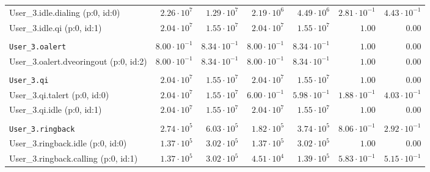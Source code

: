\begin{table}[htbp]
{\begin{tabular}{lrrrrrr}
\hspace{3mm}User\_3.idle.dialing (p:0, id:0)          &  $2.26 \cdot 10^{7}$ &  $1.29 \cdot 10^{7}$ &  $2.19 \cdot 10^{6}$ &  $4.49 \cdot 10^{6}$ & $2.81 \cdot 10^{-1}$ & $4.43 \cdot 10^{-1}$ \\
\hspace{3mm}User\_3.idle.qi (p:0, id:1)               &  $2.04 \cdot 10^{7}$ &  $1.55 \cdot 10^{7}$ &  $2.04 \cdot 10^{7}$ &  $1.55 \cdot 10^{7}$ &               $1.00$ &               $0.00$ \\
\\[-8pt]\texttt{User\_3.oalert}                       & $8.00 \cdot 10^{-1}$ & $8.34 \cdot 10^{-1}$ & $8.00 \cdot 10^{-1}$ & $8.34 \cdot 10^{-1}$ &               $1.00$ &               $0.00$ \\
\hspace{3mm}User\_3.oalert.dveoringout (p:0, id:2)    & $8.00 \cdot 10^{-1}$ & $8.34 \cdot 10^{-1}$ & $8.00 \cdot 10^{-1}$ & $8.34 \cdot 10^{-1}$ &               $1.00$ &               $0.00$ \\
\\[-8pt]\texttt{User\_3.qi}                           &  $2.04 \cdot 10^{7}$ &  $1.55 \cdot 10^{7}$ &  $2.04 \cdot 10^{7}$ &  $1.55 \cdot 10^{7}$ &               $1.00$ &               $0.00$ \\
\hspace{3mm}User\_3.qi.talert (p:0, id:0)             &  $2.04 \cdot 10^{7}$ &  $1.55 \cdot 10^{7}$ & $6.00 \cdot 10^{-1}$ & $5.98 \cdot 10^{-1}$ & $1.88 \cdot 10^{-1}$ & $4.03 \cdot 10^{-1}$ \\
\hspace{3mm}User\_3.qi.idle (p:0, id:1)               &  $2.04 \cdot 10^{7}$ &  $1.55 \cdot 10^{7}$ &  $2.04 \cdot 10^{7}$ &  $1.55 \cdot 10^{7}$ &               $1.00$ &               $0.00$ \\
\\[-8pt]\texttt{User\_3.ringback}                     &  $2.74 \cdot 10^{5}$ &  $6.03 \cdot 10^{5}$ &  $1.82 \cdot 10^{5}$ &  $3.74 \cdot 10^{5}$ & $8.06 \cdot 10^{-1}$ & $2.92 \cdot 10^{-1}$ \\
\hspace{3mm}User\_3.ringback.idle (p:0, id:0)         &  $1.37 \cdot 10^{5}$ &  $3.02 \cdot 10^{5}$ &  $1.37 \cdot 10^{5}$ &  $3.02 \cdot 10^{5}$ &               $1.00$ &               $0.00$ \\
\hspace{3mm}User\_3.ringback.calling (p:0, id:1)      &  $1.37 \cdot 10^{5}$ &  $3.02 \cdot 10^{5}$ &  $4.51 \cdot 10^{4}$ &  $1.39 \cdot 10^{5}$ & $5.83 \cdot 10^{-1}$ & $5.15 \cdot 10^{-1}$ \\

\end{tabular}}
\end{table}
